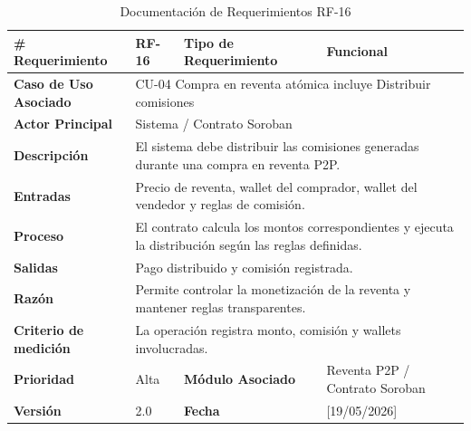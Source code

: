 \documentclass[12pt,letterpaper]{article}
\begin{document}
\begin{table}[H]
\centering
\scriptsize
\renewcommand{\arraystretch}{1.05}
\setlength{\tabcolsep}{3pt}

\newlength{\anchoceldaRFdieciseis}
\setlength{\anchoceldaRFdieciseis}{\dimexpr\textwidth-2.7cm-8\tabcolsep-5\arrayrulewidth\relax}

\begin{tabularx}{\textwidth}{|p{2.7cm}|X|p{2.8cm}|X|}
\hline
\textbf{\# Requerimiento} & RF-16 & \textbf{Tipo de Requerimiento} & Funcional \\ \hline

\textbf{Caso de Uso Asociado} & 
\multicolumn{3}{p{\anchoceldaRFdieciseis}|}{CU-04 Compra en reventa atómica incluye Distribuir comisiones} \\ \hline

\textbf{Actor Principal} & 
\multicolumn{3}{p{\anchoceldaRFdieciseis}|}{Sistema / Contrato Soroban} \\ \hline

\textbf{Descripción} & 
\multicolumn{3}{p{\anchoceldaRFdieciseis}|}{El sistema debe distribuir las comisiones generadas durante una compra en reventa P2P.} \\ \hline

\textbf{Entradas} & 
\multicolumn{3}{p{\anchoceldaRFdieciseis}|}{Precio de reventa, wallet del comprador, wallet del vendedor y reglas de comisión.} \\ \hline

\textbf{Proceso} & 
\multicolumn{3}{p{\anchoceldaRFdieciseis}|}{El contrato calcula los montos correspondientes y ejecuta la distribución según las reglas definidas.} \\ \hline

\textbf{Salidas} & 
\multicolumn{3}{p{\anchoceldaRFdieciseis}|}{Pago distribuido y comisión registrada.} \\ \hline

\textbf{Razón} & 
\multicolumn{3}{p{\anchoceldaRFdieciseis}|}{Permite controlar la monetización de la reventa y mantener reglas transparentes.} \\ \hline

\textbf{Criterio de medición} & 
\multicolumn{3}{p{\anchoceldaRFdieciseis}|}{La operación registra monto, comisión y wallets involucradas.} \\ \hline

\textbf{Prioridad} & Alta & \textbf{Módulo Asociado} & Reventa P2P / Contrato Soroban \\ \hline

\textbf{Versión} & 2.0 & \textbf{Fecha} & [19/05/2026] \\ \hline

\end{tabularx}

\caption{Documentación de Requerimientos RF-16}
\label{tab:documentacion_requerimientos_rf16}
\normalsize
\end{table}
\end{document}
